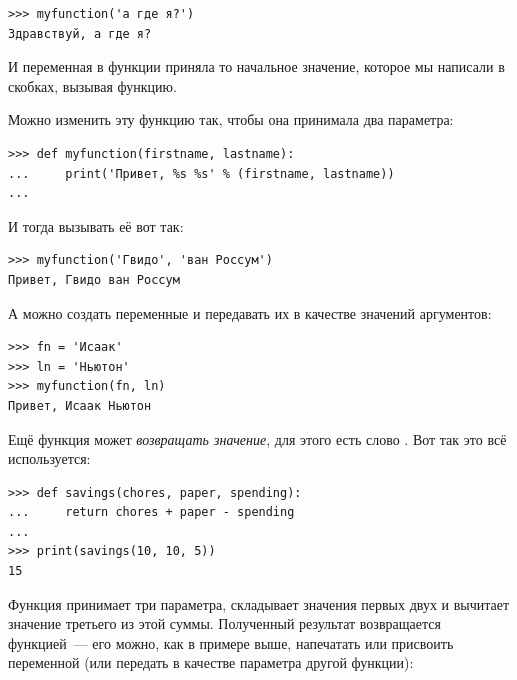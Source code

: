 \begin{listing}
\begin{verbatim}
>>> myfunction('а где я?')
Здравствуй, а где я?
\end{verbatim}
\end{listing}

И переменная  в функции приняла то начальное значение, которое мы написали в скобках, вызывая функцию.

Можно изменить эту функцию так, чтобы она принимала два параметра:

\begin{listing}
\begin{verbatim}
>>> def myfunction(firstname, lastname):
...     print('Привет, %s %s' % (firstname, lastname))
...
\end{verbatim}
\end{listing}

И тогда вызывать её вот так:

\begin{listing}
\begin{verbatim}
>>> myfunction('Гвидо', 'ван Россум')
Привет, Гвидо ван Россум
\end{verbatim}
\end{listing}

А можно создать переменные и передавать их в качестве значений аргументов:

\begin{listing}
\begin{verbatim}
>>> fn = 'Исаак'
>>> ln = 'Ньютон'
>>> myfunction(fn, ln)
Привет, Исаак Ньютон
\end{verbatim}
\end{listing}

Ещё функция может \emph{возвращать значение}, для этого есть слово . Вот так это всё используется:

\begin{listing}
\begin{verbatim}
>>> def savings(chores, paper, spending):
...     return chores + paper - spending
...
>>> print(savings(10, 10, 5))
15
\end{verbatim}
\end{listing}

Функция принимает три параметра, складывает значения первых двух и вычитает значение третьего из этой суммы. Полученный результат возвращается функцией — его можно, как в примере выше, напечатать или присвоить переменной (или передать в качестве параметра другой функции):

